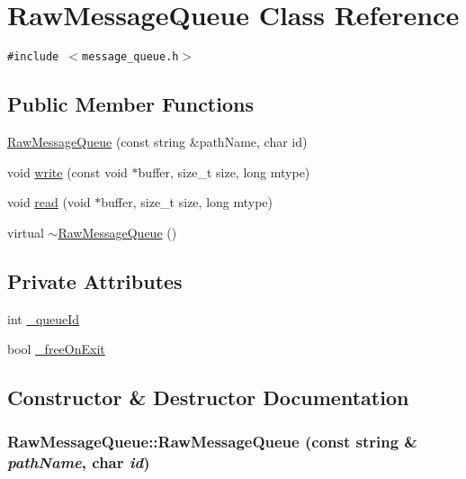 \hypertarget{classRawMessageQueue}{
\section{RawMessageQueue Class Reference}
\label{classRawMessageQueue}
}
{\tt \#include $<$message\_\-queue.h$>$}

\subsection*{Public Member Functions}
\begin{CompactItemize}
\item 
\hyperlink{classRawMessageQueue_38262143d59ad47f122d6cbd57030b28}{RawMessageQueue} (const string \&pathName, char id)
\item 
void \hyperlink{classRawMessageQueue_7fda81eaf94a970e82241d6efa2562d5}{write} (const void $\ast$buffer, size\_\-t size, long mtype)
\item 
void \hyperlink{classRawMessageQueue_0dbcbf9af9fa704119de2d2ef6f90371}{read} (void $\ast$buffer, size\_\-t size, long mtype)
\item 
virtual \hyperlink{classRawMessageQueue_741c6b10b9e2b1be969b59194ac0452c}{$\sim$RawMessageQueue} ()
\end{CompactItemize}
\subsection*{Private Attributes}
\begin{CompactItemize}
\item 
int \hyperlink{classRawMessageQueue_457f069a4d7f9b7adcadee8af2ddb4cd}{\_\-queueId}
\item 
bool \hyperlink{classRawMessageQueue_2dc13c3e504b33527dbea9ceb06d640c}{\_\-freeOnExit}
\end{CompactItemize}


\subsection{Constructor \& Destructor Documentation}
\hypertarget{classRawMessageQueue_38262143d59ad47f122d6cbd57030b28}{
\subsubsection[{RawMessageQueue}]{\setlength{\rightskip}{0pt plus 5cm}RawMessageQueue::RawMessageQueue (const string \& {\em pathName}, \/  char {\em id})}}
\label{classRawMessageQueue_38262143d59ad47f122d6cbd57030b28}


